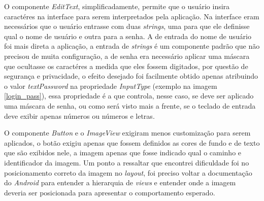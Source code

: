 \documentclass[hidelinks,12pt]{article}
\begin{document}
O componente \textit{EditText}, simplificadamente, permite que o usu\'ario insira caract\'eres na interface para serem interpretados pela aplica\c{c}\~ao. Na interface eram necess\'arios que o usu\'ario entrasse com duas \textit{strings}, uma para que ele definisse qual o nome de usu\'ario e outra para a senha. A de entrada do nome de usu\'ario foi mais direta a aplica\c{c}\~ao, a entrada de \textit{strings} \'e um componente padr\~ao que n\~ao precisou de muita configura\c{c}\~ao, a de senha era necess\'ario aplicar uma m\'ascara que ocultasse os caract\'eres a medida que eles fossem digitados, por quest\~ao de seguran\c{c}a e privacidade, o efeito desejado foi facilmente obtido apenas atribuindo o valor \textit{textPassword} na propriedade \textit{InputType} (exemplo na imagem \ref{login_pass}), essa propriedade \'e a que controla, nesse caso, se deve ser aplicado uma m\'ascara de senha, ou como ser\'a visto mais a frente, se o teclado de entrada deve exibir apenas n\'umeros ou n\'umeros e letras.

O componente \textit{Button} e o \textit{ImageView} exigiram menos customiza\c{c}\~ao para serem aplicados, o bot\~ao exigiu apenas que fossem definidos as cores de fundo e de texto que s\~ao exibidos nele, a imagem apenas que fosse indicado qual o caminho e identificador da imagem. Um ponto a ressaltar que encontrei dificuldade foi no posicionamento correto da imagem no \textit{layout}, foi preciso voltar a documenta\c{c}\~ao do \textit{Android} para entender a hierarquia de \textit{views} \cite{viewslay} e entender onde a imagem deveria ser posicionada para apresentar o comportamento esperado.
\end{document}

